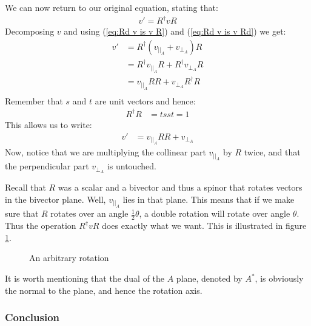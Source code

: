 \documentclass[10pt]{report}
\begin{document}
We can now return to our original equation, stating that:
\begin{align*}
    v' = R^\dagger v R
\end{align*}
Decomposing $v$ and using (\ref{eq:Rd v is v R}) and (\ref{eq:Rd v is v Rd}) we get:
\begin{align*}
    v' &= R^\dagger (v_{||_A} + v_{\bot_A}) R               \\
       &= R^\dagger v_{||_A} R + R^\dagger v_{\bot_A} R     \\
       &= v_{||_A} RR + v_{\bot_A} R^\dagger R              \\
\end{align*}
Remember that $s$ and $t$ are unit vectors and hence:
\begin{align*}
    R^\dagger R &= tsst = 1
\end{align*}
This allows us to write:
\begin{align*}
    v' &= v_{||_A} RR + v_{\bot_A}
\end{align*}
Now, notice that we are multiplying the collinear part $v_{||_A}$
by $R$ twice, and that the perpendicular part $v_{\bot_A}$ is
untouched.

Recall that $R$ was a scalar and a bivector and thus a spinor that
rotates vectors in the bivector plane. Well, $v_{||_A}$ lies in
that plane. This means that if we make sure that $R$ rotates over
an angle $\frac{1}{2}\theta$, a double rotation will rotate over
angle $\theta$. Thus the operation $R^\dagger v R$ does exactly
what we want. This is illustrated in figure \ref{fig:rotation}.

\begin{figure}[ht]
\centering

\caption{An arbitrary rotation} \label{fig:rotation}
\end{figure}

It is worth mentioning that the dual of the $A$ plane, denoted by
$A^*$, is obviously the normal to the plane, and hence the
rotation axis.

\subsubsection{Conclusion}
\end{document}
